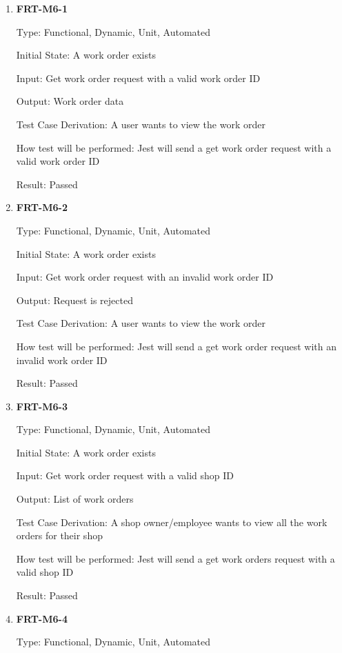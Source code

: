 \documentclass[12pt, titlepage]{article}
\begin{document}
\begin{enumerate}

	\item \textbf{FRT-M6-1}

	      Type: Functional, Dynamic, Unit, Automated

	      Initial State: A work order exists

	      Input: Get work order request with a valid work order ID

	      Output: Work order data

	      Test Case Derivation: A user wants to view the work order

	      How test will be performed: Jest will send a get work order request with a valid work order ID

	      Result: Passed

	\item \textbf{FRT-M6-2}

	      Type: Functional, Dynamic, Unit, Automated

	      Initial State: A work order exists

	      Input: Get work order request with an invalid work order ID

	      Output: Request is rejected

	      Test Case Derivation: A user wants to view the work order

	      How test will be performed: Jest will send a get work order request with an invalid work order ID

	      Result: Passed

	\item \textbf{FRT-M6-3}

	      Type: Functional, Dynamic, Unit, Automated

	      Initial State: A work order exists

	      Input: Get work order request with a valid shop ID

	      Output: List of work orders

	      Test Case Derivation: A shop owner/employee wants to view all the work orders for their shop

	      How test will be performed: Jest will send a get work orders request with a valid shop ID

	      Result: Passed

	\item \textbf{FRT-M6-4}

	      Type: Functional, Dynamic, Unit, Automated


\end{enumerate}
\end{document}

